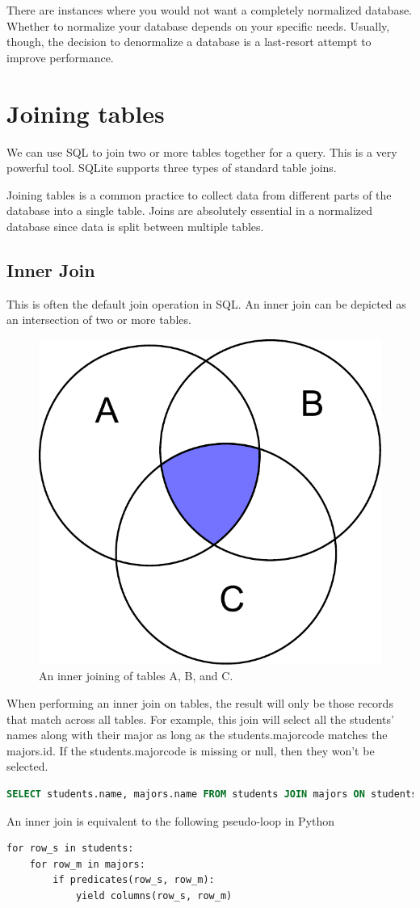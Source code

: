 \begin{info}
There are instances where you would not want a completely normalized database.
Whether to normalize your database depends on your specific needs.
Usually, though, the decision to denormalize a database is a last-resort attempt to improve performance.
\end{info}

\section*{Joining tables}
We can use SQL to join two or more tables together for a query.
This is a very powerful tool.
SQLite supports three types of standard table joins.

Joining tables is a common practice to collect data from different parts of the database into a single table.
Joins are absolutely essential in a normalized database since data is split between multiple tables.

\subsection*{Inner Join}
This is often the default join operation in SQL.
An inner join can be depicted as an intersection of two or more tables.
\begin{figure}
\centering
\includegraphics[width=.5\textwidth]{inner_join.pdf}
\caption{An inner joining of tables A, B, and C.}
\label{fig:inner_join}
\end{figure}
When performing an inner join on tables, the result will only be those records that match across all tables.
For example, this join will select all the students' names along with their major as long as the students.majorcode matches the majors.id.
If the students.majorcode is missing or null, then they won't be selected.
\begin{lstlisting}[language=SQL]
SELECT students.name, majors.name FROM students JOIN majors ON students.majorcode=majors.id;
\end{lstlisting}
An inner join is equivalent to the following pseudo-loop in Python
\begin{lstlisting}
for row_s in students:
    for row_m in majors:
        if predicates(row_s, row_m):
            yield columns(row_s, row_m)
\end{lstlisting}

